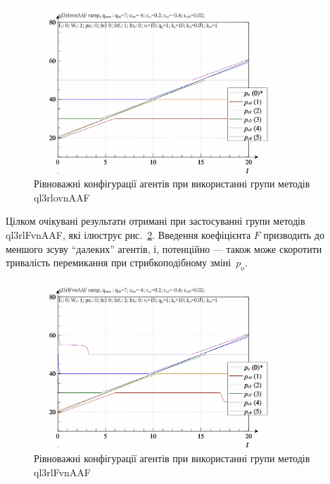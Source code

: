 \begin{figure}[htb!]
  \begin{center}
    \includegraphics[width=0.8\textwidth]{p/ramp/qls-p_t_pi_ql3rlovnAAF_ramp.png}
  \end{center}
  \caption{Рівноважні конфігурації агентів при використанні групи методів ql3rlovnAAF}
  \label{atu:f:qls_ramp_ql3rlovnAAF}
\end{figure}

Цілком очікувані результати отримані при застосуванні групи методів
ql3rlFvnAAF, які ілюструє рис.~\ref{atu:f:qls_ramp_ql3rlFvnAAF}. Введення коефіцієнта
$F$ призводить до меншого зсуву ``далеких'' агентів, і,
потенційно --- також може скоротити тривалість перемикання при
стрибкоподібному зміні~$p_o$.

\begin{figure}[htb!]
  \begin{center}
    \includegraphics[width=0.8\textwidth]{p/ramp/qls-p_t_pi_ql3rlFvnAAF_ramp.png}
  \end{center}
  \caption{Рівноважні конфігурації агентів при використанні групи методів ql3rlFvnAAF}
  \label{atu:f:qls_ramp_ql3rlFvnAAF}
\end{figure}


